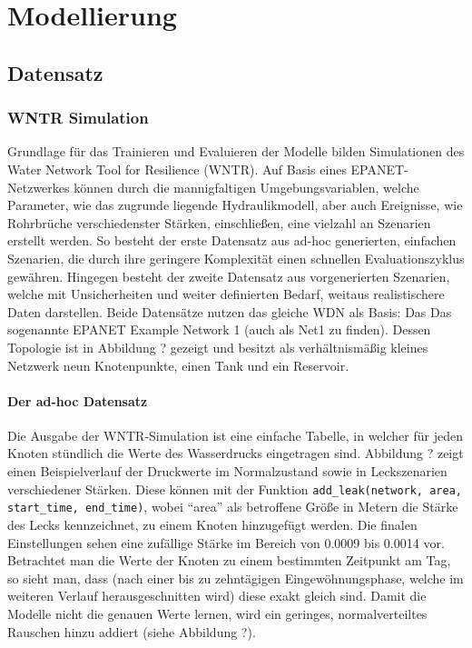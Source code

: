 \chapter{Modellierung \label{Chapter-Methods}}

\section{Datensatz}

\subsection*{WNTR Simulation}

Grundlage für das Trainieren und Evaluieren der Modelle bilden Simulationen des Water Network Tool for Resilience
 (WNTR). Auf Basis eines EPANET-Netzwerkes können durch die mannigfaltigen Umgebungsvariablen, welche Parameter,
 wie das zugrunde liegende Hydraulikmodell, aber auch Ereignisse, wie Rohrbrüche verschiedenster Stärken,
 einschließen, eine vielzahl an Szenarien erstellt werden. So besteht der erste Datensatz aus ad-hoc generierten, 
 einfachen Szenarien, die durch ihre geringere Komplexität einen schnellen Evaluationszyklus gewähren. Hingegen
 besteht der zweite Datensatz aus vorgenerierten Szenarien, welche mit Unsicherheiten und weiter definierten
 Bedarf, weitaus realistischere Daten darstellen. Beide Datensätze nutzen das gleiche WDN als Basis: Das Das
 sogenannte EPANET Example Network 1 (auch als Net1 zu finden). Dessen Topologie ist in Abbildung ? gezeigt
 und besitzt als verhältnismäßig kleines Netzwerk neun Knotenpunkte, einen Tank und ein Reservoir.

\subsubsection*{Der ad-hoc Datensatz}

Die Ausgabe der WNTR-Simulation ist eine einfache Tabelle, in welcher für jeden Knoten stündlich die Werte des
 Wasserdrucks eingetragen sind. Abbildung ? zeigt einen Beispielverlauf der Druckwerte im Normalzustand sowie
 in Leckszenarien verschiedener Stärken. Diese können mit der Funktion
 \texttt{add\_leak(network, area, start\_time, end\_time)}, wobei “area” als betroffene Größe in Metern die Stärke
 des Lecks kennzeichnet, zu einem Knoten hinzugefügt werden. Die finalen Einstellungen sehen eine zufällige Stärke
 im Bereich von 0.0009 bis 0.0014 vor. Betrachtet man die Werte der Knoten zu einem bestimmten Zeitpunkt am Tag,
 so sieht man, dass (nach einer bis zu zehntägigen Eingewöhnungsphase, welche im weiteren Verlauf herausgeschnitten
 wird) diese exakt gleich sind. Damit die Modelle nicht die genauen Werte lernen, wird ein geringes,
 normalverteiltes Rauschen hinzu addiert (siehe Abbildung ?).


